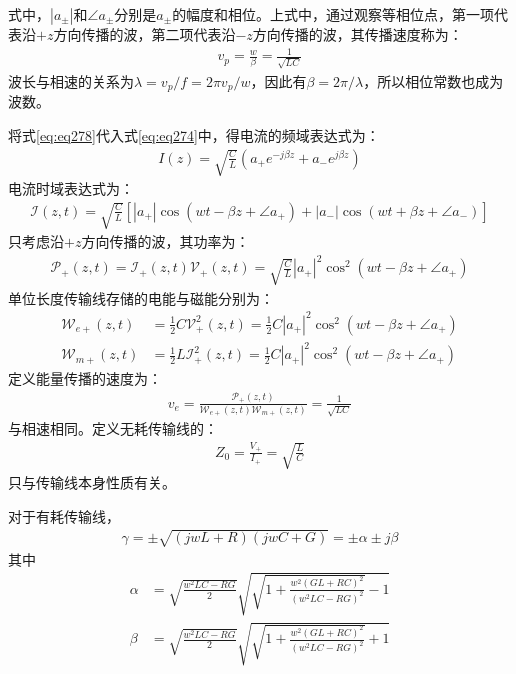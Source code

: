 \documentclass{article}
\numberwithin{equation}{section}
\begin{document}
式中，$|a_{\pm}|$和$\angle a_{\pm}$分别是$a_{\pm}$的幅度和相位。上式中，通过观察等相位点，第一项代表沿$+z$方向传播的波，第二项代表沿$-z$方向传播的波，其传播速度称为\textbf{\color{blue}{相速}}：
\begin{align}
    \label{eq:eq280}
    v_p=\frac{w}{\beta}=\frac{1}{\sqrt{LC}}
\end{align}
波长与相速的关系为$\lambda=v_p/f=2\pi v_p/w$，因此有$\beta=2\pi /\lambda$，所以相位常数也成为波数。\par
将式\ref{eq:eq278}代入式\ref{eq:eq274}中，得电流的频域表达式为：
\begin{align}
    \label{eq:eq281}
    I(z)=\sqrt{\frac{C}{L}}(a_+e^{-j\beta z}+a_-e^{j\beta z})
\end{align}
电流时域表达式为：
\begin{align}
    \label{eq:eq282}
    \mathcal{I}(z,t)=\sqrt{\frac{C}{L}}[|a_+|\cos(wt-\beta z+\angle a_+)+|a_-|\cos(wt+\beta z+\angle a_-)]
\end{align}
只考虑沿$+z$方向传播的波，其功率为：
\begin{align}
    \label{eq:eq283}
    \mathcal{P}_+(z,t)=\mathcal{I}_+(z,t)\mathcal{V}_+(z,t)=\sqrt{\frac{C}{L}}|a_+|^2\cos^2(wt-\beta z+\angle a_+)
\end{align}
单位长度传输线存储的电能与磁能分别为：
\begin{align}
    \label{eq:eq284}
    \mathcal{W}_{e+}(z,t)&=\frac{1}{2}C\mathcal{V}_+^2(z,t)=\frac{1}{2}C|a_+|^2\cos^2(wt-\beta z+\angle a_+) \\
    \label{eq:eq285}
    \mathcal{W}_{m+}(z,t)&=\frac{1}{2}L\mathcal{I}_+^2(z,t)=\frac{1}{2}C|a_+|^2\cos^2(wt-\beta z+\angle a_+)
\end{align}
定义能量传播的速度为\textbf{\color{blue}{能速}}：
\begin{align}
    \label{eq:eq286}
    v_e=\frac{\mathcal{P}_+(z,t)}{\mathcal{W}_{e+}(z,t)\mathcal{W}_{m+}(z,t)}=\frac{1}{\sqrt{LC}}
\end{align}
与相速相同。定义无耗传输线的\textbf{\color{blue}{特征阻抗}}：
\begin{align}
    \label{eq:eq287}
    Z_0=\frac{V_+}{I_+}=\sqrt{\frac{L}{C}}
\end{align}
只与传输线本身性质有关。\par
对于有耗传输线，
\begin{align}
    \label{eq:eq288}
    \gamma=\pm\sqrt{(jwL+R)(jwC+G)}=\pm\alpha\pm j\beta
\end{align}
其中
\begin{align}
    \label{eq:eq289}
    \alpha&=\sqrt{\frac{w^2LC-RG}{2}}\sqrt{\sqrt{1+\frac{w^2(GL+RC)^2}{(w^2LC-RG)^2}}-1} \\
    \label{eq:eq290}
    \beta&=\sqrt{\frac{w^2LC-RG}{2}}\sqrt{\sqrt{1+\frac{w^2(GL+RC)^2}{(w^2LC-RG)^2}}+1}
\end{align}
\end{document}
